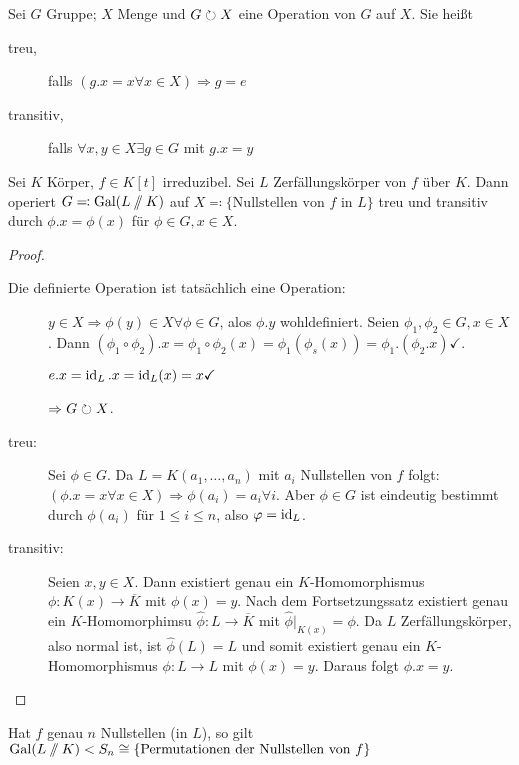 \documentclass[12pt,a4paper]{scrartcl}
\begin{document}
\begin{defi}
	Sei $G$ Gruppe; $X$ Menge und $G\circlearrowright X$ eine Operation von $G$ auf $X$. Sie heißt
	\begin{description}
		\item[treu,] falls $(g.x = x\forall x\in X)\Rightarrow g = e$
		\item[transitiv,] falls $\forall x,y\in X\exists g\in G$ mit $g.x = y$
	\end{description}
\end{defi}	
\begin{satz}
	 Sei $K$ Körper, $f\in K[t]$ irreduzibel. Sei $L$ Zerfällungskörper von $f$ über $K$. Dann operiert $G\eqqcolon \operatorname{Gal}(L\sslash K)$ auf $X\eqqcolon \{\text{Nullstellen von }f\text{ in }L\}$ treu und transitiv durch $\phi.x = \phi(x)$ für $\phi\in G, x\in X$. 
\end{satz}	
\begin{proof}
	\leavevmode
	\begin{description}
	\item[Die definierte Operation ist tatsächlich eine Operation:] $y\in X\Rightarrow \phi(y)\in X\forall\phi \in G$, alos $\phi.y$ wohldefiniert. Seien $\phi_1,\phi_2\in G, x\in X$. Dann $(\phi_1\circ\phi_2).x = \phi_1\circ\phi_2(x) = \phi_1(\phi_s(x)) = \phi_1.(\phi_2.x)\checkmark$.
	
	$e.x = \operatorname{id}_L.x = \operatorname{id}_L(x) = x\checkmark$
	
	$\Rightarrow G\circlearrowright X$.
	\item[treu:] Sei $\phi\in G$. Da $L = K(a_1,\dots, a_n)$ mit $a_i$ Nullstellen von $f$ folgt: $(\phi.x = x\forall x\in X)\Rightarrow \phi(a_i) = a_i\forall i$. Aber $\phi\in G$ ist eindeutig bestimmt durch $\phi(a_i)$ für $1\leq i\leq n$, also $\varphi = \operatorname{id}_L$.
	\item[transitiv:] Seien $x,y\in X$. Dann existiert genau ein $K$-Homomorphismus $\phi\colon K(x)\to\overline{K}$ mit $\phi(x) = y$. Nach dem Fortsetzungssatz existiert genau ein $K$-Homomorphimsu $\hat{\phi}\colon L\to\overline{K}$ mit $\hat{\phi}|_{K(x)}  =\phi$. Da $L$ Zerfällungskörper, also normal ist, ist $\hat{\phi}(L) = L$ und somit existiert genau ein $K$-Homomorphismus $\phi\colon L\to L$ mit $\phi(x) =y$. Daraus folgt $\phi.x = y$.
	\end{description}
\end{proof}


\begin{bem}
	Hat $f$ genau $n$ Nullstellen (in $L$), so gilt $\operatorname{Gal}(L\sslash K) < S_n\cong\{\text{Permutationen der Nullstellen von }f\}$
\end{bem}
\end{document}
